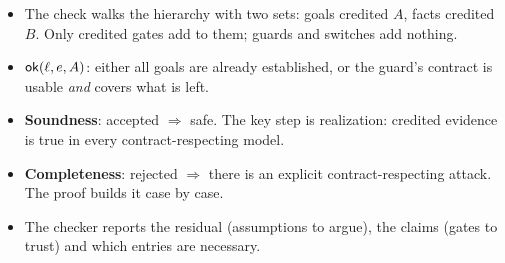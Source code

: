 \begin{recap}
\begin{itemize}
\item The check walks the hierarchy with two sets: goals credited $A$, facts credited $B$. Only credited gates add to them; guards and switches add nothing.
\item $\mathsf{ok}(\ell,e,A)$: either all goals are already established, or the guard's contract is usable \emph{and} covers what is left.
\item \textbf{Soundness}: accepted $\Rightarrow$ safe. The key step is realization: credited evidence is true in every contract-respecting model.
\item \textbf{Completeness}: rejected $\Rightarrow$ there is an explicit contract-respecting attack. The proof builds it case by case.
\item The checker reports the residual (assumptions to argue), the claims (gates to trust) and which entries are necessary.
\end{itemize}
\end{recap}
